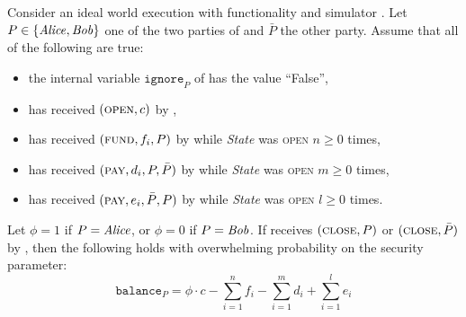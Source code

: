 \begin{lemma}
\label{lemma:ideal-balance}
  Consider an ideal world execution with functionality \fchan and simulator
  \simulator. Let $P \in \{\mathit{Alice}, \mathit{Bob}\}$ one of the two parties of \fchan and
  $\bar{P}$ the other party. Assume that all of the following are true:
  \begin{itemize}
    \item the internal variable $\texttt{ignore}_P$ of \fchan has the value
    ``False'',
    \item \fchan has received $(\textsc{open}, c)$ by \simulator,
    \item \fchan has received $(\textsc{fund}, f_i, P)$ by \simulator while
    \textit{State} was \textsc{open} $n \geq 0$ times,
    \item \fchan has received $(\textsc{pay}, d_i, P, \bar{P})$ by \simulator
    while \textit{State} was \textsc{open} $m \geq 0$ times,
    \item \fchan has received $(\textsc{pay}, e_i, \bar{P}, P)$ by \simulator
    while \textit{State} was \textsc{open} $l \geq 0$ times.
  \end{itemize}
  Let $\phi = 1$ if $P = \mathit{Alice}$, or $\phi = 0$ if $P = \mathit{Bob}$. If \fchan
  receives $(\textsc{close}, P)$ or $(\textsc{close}, \bar{P})$ by \simulator,
  then the following holds with overwhelming probability on the security
  parameter:
  \begin{equation}
    \texttt{balance}_P = \phi \cdot c - \sum\limits_{i=1}^n f_i -
    \sum\limits_{i=1}^m d_i + \sum\limits_{i=1}^l e_i
  \end{equation}
\end{lemma}

